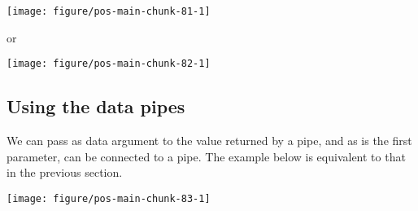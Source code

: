 \documentclass[krantz2]{krantz}\usepackage{knitr}%
\begin{document}
\begin{explainbox}
\begin{knitrout}
{\centering \texttt{[image: figure/pos-main-chunk-81-1]} 

}



\end{knitrout}

or

\begin{knitrout}\footnotesize
{}\color{fgcolor}\begin{kframe}
\begin{alltt}
\hlstd{()} \hlopt{+}
  \hlstd{(} 
             \hlstd{(}     \hlstd{=} 
\end{alltt}
\end{kframe}

{\centering \texttt{[image: figure/pos-main-chunk-82-1]} 

}



\end{knitrout}
\end{explainbox}

\subsection{Using the data pipes}

We can pass as data argument to  the value returned by a pipe, and as  is the first parameter,  can be connected to a pipe. The example below is equivalent to that in the previous section.

\begin{knitrout}\footnotesize
{}\color{fgcolor}

{\centering \texttt{[image: figure/pos-main-chunk-83-1]} 

}



\end{knitrout}
\end{document}
